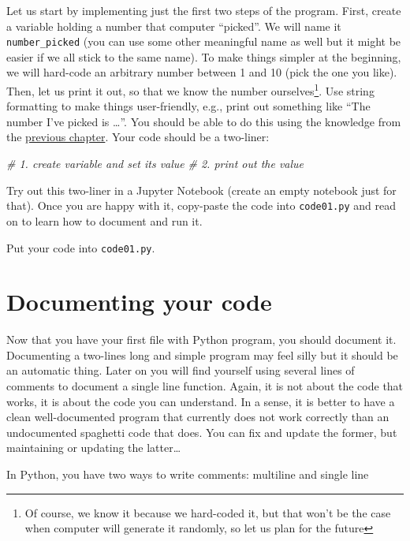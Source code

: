 \documentclass[
]{book}
\newenvironment{Shaded}{\begin{snugshade}}{\end{snugshade}}
\newcommand{\CommentTok}[1]{\textcolor[rgb]{0.56,0.35,0.01}{\textit{#1}}}
\begin{document}
Let us start by implementing just the first two steps of the program. First, create a variable holding a number that computer ``picked''. We will name it \texttt{number\_picked} (you can use some other meaningful name as well but it might be easier if we all stick to the same name). To make things simpler at the beginning, we will hard-code an arbitrary number between 1 and 10 (pick the one you like). Then, let us print it out, so that we know the number ourselves\footnote{Of course, we know it because we hard-coded it, but that won't be the case when computer will generate it randomly, so let us plan for the future}. Use string formatting to make things user-friendly, e.g., print out something like ``The number I've picked is \ldots{}''. You should be able to do this using the knowledge from the \protect\hyperlink{string-formatting}{previous chapter}. Your code should be a two-liner:

\begin{Shaded}
\begin{Highlighting}[]
\CommentTok{\# 1. create variable and set its value}
\CommentTok{\# 2. print out the value}
\end{Highlighting}
\end{Shaded}

Try out this two-liner in a Jupyter Notebook (create an empty notebook just for that). Once you are happy with it, copy-paste the code into \texttt{code01.py} and read on to learn how to document and run it.

Put your code into \texttt{code01.py}.

\hypertarget{documenting-your-code}{%
\section{Documenting your code}\label{documenting-your-code}}

Now that you have your first file with Python program, you should document it. Documenting a two-lines long and simple program may feel silly but it should be an automatic thing. Later on you will find yourself using several lines of comments to document a single line function. Again, it is not about the code that works, it is about the code you can understand. In a sense, it is better to have a clean well-documented program that currently does not work correctly than an undocumented spaghetti code that does. You can fix and update the former, but maintaining or updating the latter\ldots{}

In Python, you have two ways to write comments: multiline and single line
\end{document}
